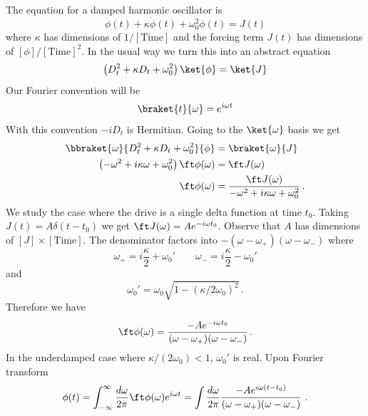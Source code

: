 
The equation for a damped harmonic oscillator is
\begin{equation}
  \ddot{\phi}(t) + \kappa \dot{\phi}(t) + \omega_0^2 \phi(t) = J(t)
\end{equation}
where $\kappa$ has dimensions of $1 / [\text{Time}]$ and the forcing term $J(t)$ has dimensions of $[\phi]/[\text{Time}]^2$.
In the usual way we turn this into an abstract equation
\begin{equation}
  \left( D_t^2 + \kappa D_t + \omega_0^2 \right) \ket{\phi} = \ket{J}
\end{equation}
Our Fourier convention will be
\begin{equation}
  \braket{t}{\omega} = e^{i\omega t}
\end{equation}
With this convention $-iD_t$ is Hermitian.
Going to the $\ket{\omega}$ basis we get
\begin{align}
  \bbraket{\omega}{D_t^2 + \kappa D_t + \omega_0^2}{\phi} &= \braket{\omega}{J} \nonumber \\
  \left( -\omega^2 + i \kappa \omega + \omega_0^2 \right) \ft \phi(\omega) & = \ft J(\omega) \nonumber \\
  \ft \phi(\omega) & = \frac{\ft J(\omega)}{-\omega^2 + i \kappa \omega + \omega_0^2}
  \, .
\end{align}
We study the case where the drive is a single delta function at time $t_0$.
Taking $J(t) = A \delta(t - t_0)$ we get $\ft J(\omega) = A e^{-i \omega t_0}$.
Observe that $A$ has dimensions of $[J] \times [\text{Time}]$.
The denominator factors into $-(\omega - \omega_+)(\omega - \omega_-)$ where
\begin{equation}
  \omega_+ = i \frac{\kappa}{2} + \omega_0' \qquad \omega_{-} = i \frac{\kappa}{2} - \omega_0' \label{eq:omega_plus_minus}
\end{equation}
and
\begin{equation}
  \omega_0' = \omega_0 \sqrt{ 1 - \left( \kappa / 2 \omega_0 \right)^2 } \, .
\end{equation}
Therefore we have
\begin{equation}
  \ft \phi(\omega) = \frac{-A e^{-i \omega t_0}}{(\omega - \omega_{+})(\omega-\omega_{-})} \, .
\end{equation}
In the underdamped case where $\kappa / (2 \omega_0) < 1$, $\omega_0'$ is real.
Upon Fourier transform
\begin{equation}
  \phi(t) = 
  \int_{- \infty}^\infty \frac{d\omega}{2\pi} \ft \phi(\omega) e^{i \omega t}
  = \int \frac{d \omega}{2 \pi} \frac{-Ae^{i \omega(t - t_0)}}{(\omega-\omega_{+})(\omega-\omega_{-})} \,
  \, .
\end{equation}
